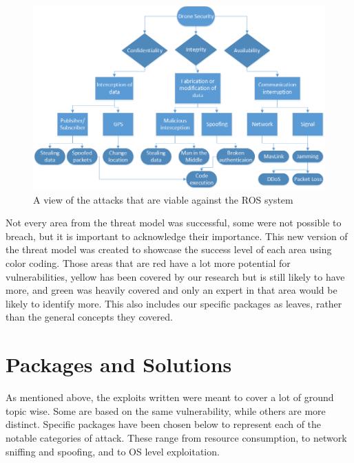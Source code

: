 \documentclass[IEEEtran,letterpaper,10pt,notitlepage,draftclsnofoot,onecolumn]{article}
\begin{document}
\begin{figure}[H]
    \centering
    \includegraphics[width=\textwidth]{model}
    \caption{A view of the attacks that are viable against the ROS system}
\end{figure}

Not every area from the threat model was successful, some were not possible to breach, but it is important to acknowledge their importance.
This new version of the threat model was created to showcase the success level of each area using color coding.
Those areas that are red have a lot more potential for vulnerabilities, yellow has been covered by our research but is still likely to have more, and green was heavily covered and only an expert in that area would be likely to identify more.
This also includes our specific packages as leaves, rather than the general concepts they covered.


\section{Packages and Solutions}
As mentioned above, the exploits written were meant to cover a lot of ground topic wise.
Some are based on the same vulnerability, while others are more distinct.
Specific packages have been chosen below to represent each of the notable categories of attack.
These range from resource consumption, to network sniffing and spoofing, and to OS level exploitation.
\end{document}
